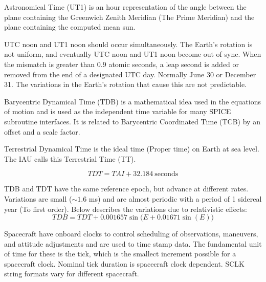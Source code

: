 \documentclass[crop=false,class=book]{standalone}
\begin{document}
            \begin{definition}
            Astronomical Time (UT1) is an hour representation of the angle between the plane containing the Greenwich Zenith Meridian (The Prime Meridian) and the plane containing the computed mean sun.
            \end{definition}
            \begin{remark}
            UTC noon and UT1 noon should occur simultaneously. The Earth's rotation is not uniform, and eventually UTC noon and UT1 noon become out of sync. When the mismatch is greater than $0.9$ atomic seconds, a leap second is added or removed from the end of a designated UTC day. Normally June 30 or December 31. The variations in the Earth's rotation that cause this are not predictable.
            \end{remark}
            \begin{definition}
            Barycentric Dynamical Time (TDB) is a mathematical idea used in the equations of motion and is used as the independent time variable for many SPICE subroutine interfaces. It is related to Barycentric Coordinated Time (TCB) by an offset and a scale factor. 
            \end{definition}
            \begin{definition}
            Terrestrial Dynamical Time is the ideal time (Proper time) on Earth at sea level. The IAU calls this Terrestrial Time (TT).
            \end{definition}
            \begin{equation}
            TDT=TAI+32.184\ \textrm{seconds}
            \end{equation}
            \begin{remark}
            TDB and TDT have the same reference epoch, but advance at different rates. Variations are small ($\sim 1.6$ ms) and are almost periodic with a period of 1 sidereal year (To first order). Below describes the variations due to relativistic effects:
            \begin{equation}
            TDB=TDT+0.001657\sin\big(E+0.01671\sin(E)\big)
            \end{equation}
            \end{remark} 
            Spacecraft have onboard clocks to control scheduling of observations, maneuvers, and attitude adjustments and are used to time stamp data. The fundamental unit of time for these is the tick, which is the smallect increment possible for a spacecraft clock. Nominal tick duration is spacecraft clock dependent. SCLK string formats vary for different spacecraft. 
\end{document}
